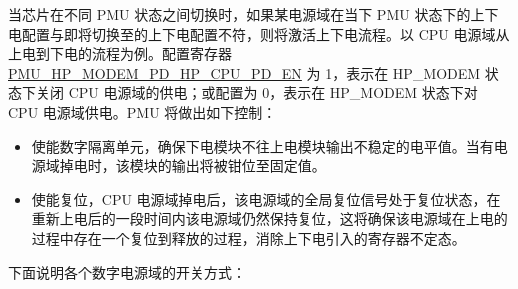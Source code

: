 \documentclass[main\_\_CN.tex]{subfiles}
\begin{document}
当芯片在不同 PMU 状态之间切换时，如果某电源域在当下 PMU 状态下的上下电配置与即将切换至的上下电配置不符，则将激活上下电流程。以 CPU 电源域从上电到下电的流程为例。配置寄存器 \hyperref[fielddesc:PMUHPMODEMPDHPCPUPDEN]{PMU\_HP\_MODEM\_PD\_HP\_CPU\_PD\_EN} 为 1，表示在 HP\_MODEM 状态下关闭 CPU 电源域的供电；或配置为 0，表示在 HP\_MODEM 状态下对 CPU 电源域供电。PMU 将做出如下控制：

\begin{itemize}

\item 使能数字隔离单元，确保下电模块不往上电模块输出不稳定的电平值。当有电源域掉电时，该模块的输出将被钳位至固定值。

\item 使能复位，CPU 电源域掉电后，该电源域的全局复位信号处于复位状态，在重新上电后的一段时间内该电源域仍然保持复位，这将确保该电源域在上电的过程中存在一个复位到释放的过程，消除上下电引入的寄存器不定态。

\end{itemize}

下面说明各个数字电源域的开关方式：
\end{document}
